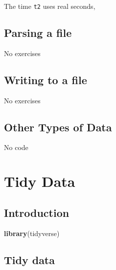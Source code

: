 \documentclass[]{book}
\newenvironment{Shaded}{\begin{snugshade}}{\end{snugshade}}
\newcommand{\CommentTok}[1]{\textcolor[rgb]{0.56,0.35,0.01}{\textit{#1}}}
\newcommand{\KeywordTok}[1]{\textcolor[rgb]{0.13,0.29,0.53}{\textbf{#1}}}
\newcommand{\NormalTok}[1]{#1}
\newcommand{\StringTok}[1]{\textcolor[rgb]{0.31,0.60,0.02}{#1}}
\theoremstyle{plain}
\theoremstyle{remark}
\begin{document}
The time \texttt{t2} uses real seconds,

\begin{Shaded}
\end{Shaded}

\hypertarget{parsing-a-file}{%
\section{Parsing a file}\label{parsing-a-file}}

No exercises

\hypertarget{writing-to-a-file}{%
\section{Writing to a file}\label{writing-to-a-file}}

No exercises

\hypertarget{other-types-of-data}{%
\section{Other Types of Data}\label{other-types-of-data}}

No code

\hypertarget{tidy-data}{%
\chapter{Tidy Data}\label{tidy-data}}

\hypertarget{introduction-7}{%
\section{Introduction}\label{introduction-7}}

\begin{Shaded}
\begin{Highlighting}[]
\KeywordTok{library}\NormalTok{(tidyverse)}
\end{Highlighting}
\end{Shaded}

\hypertarget{tidy-data-1}{%
\section{Tidy data}\label{tidy-data-1}}
\end{document}
